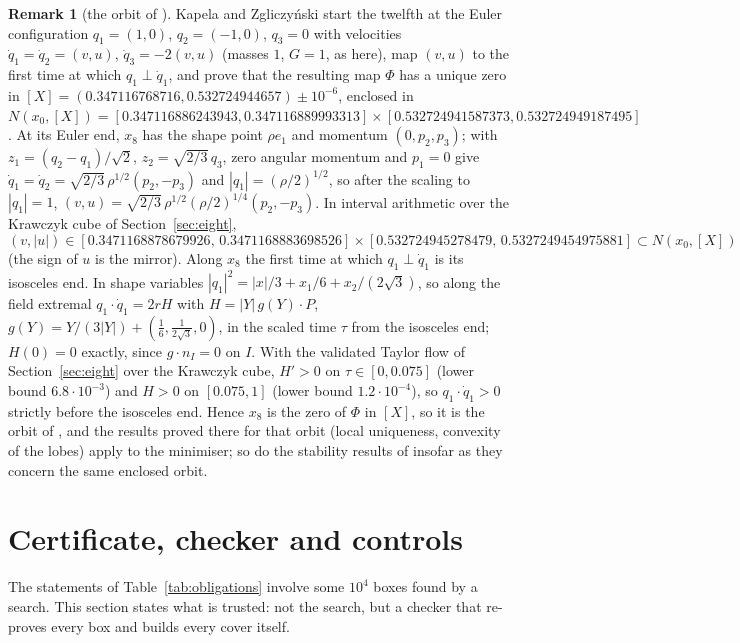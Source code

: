\documentclass[11pt]{article}
\theoremstyle{definition}
\newtheorem{remark}[theorem]{Remark}
\begin{document}
\begin{remark}[the orbit of \cite{KZ}]\label{rem:kz}
Kapela and Zgliczy\'nski start the twelfth at the Euler configuration $q_1=(1,0)$, $q_2=(-1,0)$, $q_3=0$ with
velocities $\dot q_1=\dot q_2=(v,u)$, $\dot q_3=-2(v,u)$ (masses $1$, $G=1$, as here), map $(v,u)$ to the first time at
which $q_1\perp\dot q_1$, and prove that the resulting map $\Phi$ has a unique zero in
$[X]=(0.347116768716,0.532724944657)\pm10^{-6}$, enclosed in $N(x_0,[X])=[0.347116886243943,0.347116889993313]\times
[0.532724941587373,0.532724949187495]$ \cite[Lemma~3.5]{KZ}. At its Euler end, $x_8$ has the shape point $\rho e_1$ and
momentum $(0,p_2,p_3)$; with $z_1=(q_2-q_1)/\sqrt2$, $z_2=\sqrt{2/3}\,q_3$, zero angular momentum and $p_1=0$ give
$\dot q_1=\dot q_2=\sqrt{2/3}\,\rho^{1/2}(p_2,-p_3)$ and $|q_1|=(\rho/2)^{1/2}$, so after the scaling to $|q_1|=1$,
$(v,u)=\sqrt{2/3}\,\rho^{1/2}(\rho/2)^{1/4}(p_2,-p_3)$. In interval arithmetic over the Krawczyk cube of
Section~\ref{sec:eight},
\[
(v,|u|)\in[0.3471168878679926,\,0.3471168883698526]\times[0.532724945278479,\,0.5327249454975881]\subset N(x_0,[X])
\]
(the sign of $u$ is the mirror). Along $x_8$ the first time at which $q_1\perp\dot q_1$ is its isosceles end. In shape
variables $|q_1|^2=|x|/3+x_1/6+x_2/(2\sqrt3)$, so along the field extremal $q_1\cdot\dot q_1=2rH$ with
$H=|Y|\,g(Y)\cdot P$, $g(Y)=Y/(3|Y|)+(\tfrac16,\tfrac1{2\sqrt3},0)$, in the scaled time $\tau$ from the isosceles end;
$H(0)=0$ exactly, since $g\cdot n_I=0$ on $I$. With the validated Taylor flow of Section~\ref{sec:eight} over the
Krawczyk cube, $H'>0$ on $\tau\in[0,0.075]$ (lower bound $6.8\cdot10^{-3}$) and $H>0$ on $[0.075,1]$ (lower bound
$1.2\cdot10^{-4}$), so $q_1\cdot\dot q_1>0$ strictly before the isosceles end. Hence
$x_8$ is the zero of $\Phi$ in $[X]$, so it is the orbit of \cite{KZ}, and the results proved there for that orbit
(local uniqueness, convexity of the lobes) apply to the minimiser; so do the stability results of \cite{KS,KS17}
insofar as they concern the same enclosed orbit.
\end{remark}

\section{Certificate, checker and controls}\label{sec:checker}
The statements of Table~\ref{tab:obligations} involve some $10^4$ boxes found by a search. This section states what is
trusted: not the search, but a checker that re-proves every box and builds every cover itself.
\end{document}
